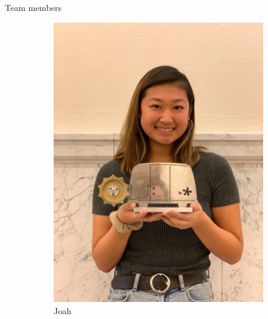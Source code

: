 \begin{frame}{Team members}
\begin{figure}[h!]
\begin{subfigure}[b]{0.22\linewidth}
       \includegraphics[scale=0.103]{figures/Joah.jpg}
        \caption{Joah}
        \label{fig:Joah}
    \end{subfigure}
     \quad
    \begin{subfigure}[b]{0.22\linewidth}

\end{subfigure}
\end{figure}
\end{frame}
